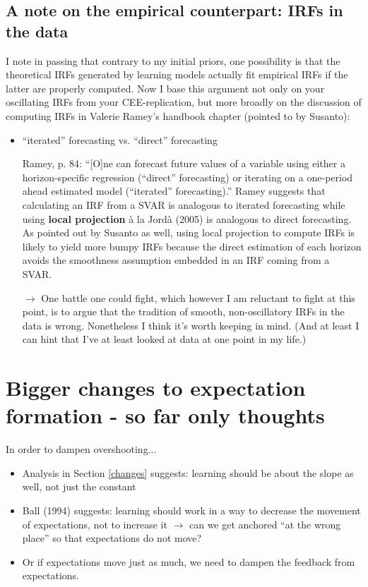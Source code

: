 \documentclass[11pt]{article}
\renewcommand{\[}{\begin{equation}}
\renewcommand{\]}{\end{equation}}
\begin{document}
\subsection{A note on the empirical counterpart: IRFs in the data}
I note in passing that contrary to my initial priors, one possibility is that the theoretical IRFs generated by learning models actually fit empirical IRFs if the latter are properly computed. Now I base this argument not only on your oscillating IRFs from your CEE-replication, but more broadly on the discussion of computing IRFs in Valerie Ramey's handbook chapter (pointed to by Susanto):
\begin{itemize}
\item ``iterated'' forecasting vs. ``direct'' forecasting
\item[] Ramey, p. 84: ``[O]ne can forecast future values of a variable using either a horizon-specific regression (``direct'' forecasting) or iterating on a one-period ahead estimated model (``iterated'' forecasting).'' Ramey suggests that calculating an IRF from a SVAR is analogous to iterated forecasting while using \textbf{local projection} \`{a} la Jord\`{a} (2005) is analogous to direct forecasting. As pointed out by Susanto as well, using local projection to compute IRFs is likely to yield more bumpy IRFs because the direct estimation of each horizon avoids the smoothness assumption embedded in an IRF coming from a SVAR.
\item[$\rightarrow$] One battle one could fight, which however I am reluctant to fight at this point, is to argue that the tradition of smooth, non-oscillatory IRFs in the data is wrong. Nonetheless I think it's worth keeping in mind. (And at least I can hint that I've at least looked at data at one point in my life.)
\end{itemize}

\section{Bigger changes to expectation formation - so far only thoughts}
In order to dampen overshooting...
\begin{itemize}
\item Analysis in Section \ref{changes} suggests: learning should be about the slope as well, not just the constant
\item Ball (1994) suggests: learning should work in a way to decrease the movement of expectations, not to increase it $\rightarrow$ can we get anchored ``at the wrong place'' so that expectations do not move?
\item Or if expectations move just as much, we need to dampen the feedback from expectations.
\end{itemize}
\end{document}
